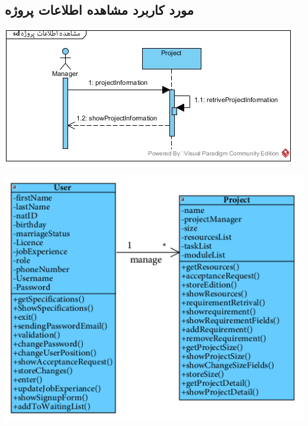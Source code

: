 \newpage
\vspace{2cm}
\subsection*{مورد کاربرد مشاهده اطلاعات پروژه}
\vspace{2cm}
\begin{center}
\includegraphics[width=\textwidth]{SequenceDiagrams/31.jpg}
\end{center}

\newpage
\vspace{2cm}
\begin{center}
\includegraphics[width=\textwidth]{SequenceClasses/31.png}
\end{center}

\newpage
\vspace{2cm}
